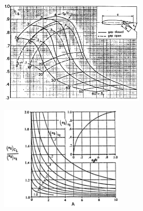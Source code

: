 %
%


\begin{figure}[H]
\centering
\begin{minipage}{.5\textwidth}
\centering
\includegraphics[height=5.3cm]{Immagini/Eta_Delta_Plain.png}
\label{efficiency}
\end{minipage}%
\begin{minipage}{.5\textwidth}
\centering
\includegraphics[height=5.3cm]{Immagini/alfadelta.png}
\label{eff2}
\end{minipage}
\label{fig:effects}
\end{figure}



